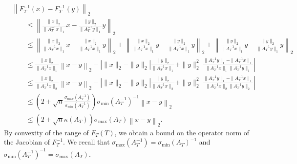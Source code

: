 \documentclass[a4paper]{article}
\begin{document}
        \begin{align*}
            &
            \left\| F_T^{-1}(x) - F_T^{-1}(y) \right\|_{2}
            \\&\qquad 
            \leq 
            \left\| 
                \frac{ \|x\|_2 }{ \| A_{T}^{-1} x \|_{1} } x - \frac{ \|y\|_2 }{ \| A_{T}^{-1} y \|_{1} } y
            \right\|_{2}
            \\&\qquad 
            \leq 
            \left\| 
                \frac{ \|x\|_2 }{ \| A_{T}^{-1} x \|_{1} } x - \frac{ \|x\|_2 }{ \| A_{T}^{-1} x \|_{1} } y
            \right\|_{2}
            +
            \left\| 
                \frac{ \|x\|_2 }{ \| A_{T}^{-1} x \|_{1} } y - \frac{ \|y\|_2 }{ \| A_{T}^{-1} x \|_{1} } y
            \right\|_{2}
            +
            \left\| 
                \frac{ \|y\|_2 }{ \| A_{T}^{-1} x \|_{1} } y - \frac{ \|y\|_2 }{ \| A_{T}^{-1} y \|_{1} } y
            \right\|_{2}
            \\&\qquad 
            \leq 
            \frac{ \|x\|_2 }{ \| A_{T}^{-1} x \|_{1} } 
            \left\| 
                x - y
            \right\|_{2}
            +
            \left| \|x\|_2 - \|y\|_2 \right|
            \frac{ \|y\|_2 }{ \| A_{T}^{-1} x \|_{1} }
            +
            \|y\|_2^{2}
            \left| 
            \frac{ \| A_{T}^{-1} y \|_{1} - \| A_{T}^{-1} x \|_{1} }{ \| A_{T}^{-1} x \|_{1} \| A_{T}^{-1} y \|_{1} }
            \right|
            \\&\qquad 
            \leq 
            \frac{ \|x\|_2 }{ \| A_{T}^{-1} x \|_{2} } 
            \left\| 
                x - y
            \right\|_{2}
            +
            \left| \|x\|_2 - \|y\|_2 \right|
            \frac{ \|y\|_2 }{ \| A_{T}^{-1} x \|_{2} }
            +
            \|y\|_2^{2}
            \left| 
            \frac{ \| A_{T}^{-1} y \|_{1} - \| A_{T}^{-1} x \|_{1} }{ \| A_{T}^{-1} x \|_{2} \| A_{T}^{-1} y \|_{2} }
            \right|
            \\&\qquad 
            \leq 
            \left( 2 + \sqrt{n} \frac{\sigma_{\max}(A_{T}^{-1}) }{ \sigma_{\min}(A_{T}^{-1}) } \right) \sigma_{\min}(A_{T}^{-1})^{-1} 
            \left\| x - y \right\|_{2}
            \\&\qquad 
            \leq 
            \left( 2 + \sqrt{n} \kappa(A_{T}) \right) \sigma_{\max}(A_{T})
            \left\| x - y \right\|_{2}
            .
        \end{align*}
        By convexity of the range of $F_T(T)$, 
        we obtain a bound on the operator norm of the Jacobian of $F_{T}^{-1}$. 
        We recall that $\sigma_{\max}(A_{T}^{-1}) = \sigma_{\min}(A_{T})^{-1}$ and $\sigma_{\min}(A_{T}^{-1})^{-1} = \sigma_{\max}(A_{T})$.
        \color{black}
        
\end{document}
